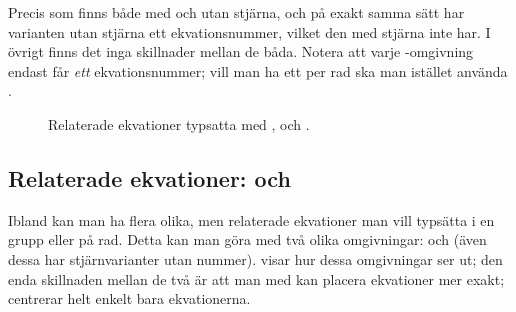 \documentclass[10pt,../../a4.tex]{subfiles}
\begin{document}
Precis som  finns  både med och utan stjärna,
och på exakt samma sätt har varianten utan stjärna ett ekvationsnummer,
vilket den med stjärna inte har. I övrigt finns det inga skillnader mellan
de båda. Notera att varje -omgivning endast får \emph{ett}
ekvationsnummer; vill man ha ett per rad ska man istället använda
.

\begin{figure}[b]
	\centering 
	\quad
	\caption{Relaterade ekvationer typsatta med , 
	och .}
	\label{fig:aligngather}
\end{figure}

\subsection{Relaterade ekvationer:  och }
Ibland kan man ha flera olika, men relaterade ekvationer man vill typsätta
i en grupp eller på rad. Detta kan man göra med två olika omgivningar:
 och  (även dessa har stjärnvarianter utan nummer).
 visar hur dessa omgivningar ser ut; den enda
skillnaden mellan de två är att man med  kan placera ekvationer
mer exakt;  centrerar helt enkelt bara ekvationerna.
\end{document}
